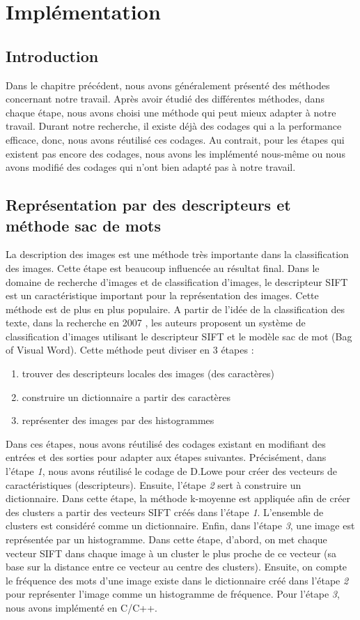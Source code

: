 \chapter{Implémentation}
\label{chap:impl}

\section{Introduction}
Dans le chapitre précédent, nous avons généralement présenté des méthodes concernant notre travail. Après avoir étudié des différentes méthodes, dans chaque étape, nous avons choisi une méthode qui peut mieux adapter à notre travail. Durant notre recherche, il existe déjà des codages qui a la performance efficace, donc, nous avons réutilisé ces codages. Au contrait, pour les étapes qui existent pas encore des codages, nous avons les implémenté nous-même ou nous avons modifié des codages qui n'ont bien adapté pas à notre travail.

\section{Représentation par des descripteurs et méthode sac de mots}
La description des images est une méthode très importante dans la classification des images. Cette étape est beaucoup influencée au résultat final. Dans le domaine de recherche d'images et de classification d'images, le descripteur SIFT \cite{low04} est un caractéristique important pour la représentation des images. Cette méthode est de plus en plus populaire. A partir de l'idée de la classification des texte, dans la recherche en 2007 \cite{bos07}, les auteurs proposent un système de classification d'images utilisant le descripteur SIFT et le modèle sac de mot (Bag of Visual Word). Cette méthode peut diviser en 3 étapes :
\begin{enumerate}
\item trouver des descripteurs locales des images (des caractères)
\item construire un dictionnaire a partir des caractères
\item représenter des images par des histogrammes
\end{enumerate}

Dans ces étapes, nous avons réutilisé des codages existant en modifiant des entrées et des sorties pour adapter aux étapes suivantes. Précisément, dans l'étape \textit{1}, nous avons réutilisé le codage de D.Lowe \cite{low99} pour créer des vecteurs de caractéristiques (descripteurs). Ensuite, l'étape \textit{2} sert à construire un dictionnaire. Dans cette étape, la méthode k-moyenne \cite{mq67} est appliquée afin de créer des clusters a partir des vecteurs SIFT créés dans l'étape \textit{1}. L'ensemble de clusters est considéré comme un dictionnaire. Enfin, dans l'étape \textit{3}, une image est représentée par un histogramme. Dans cette étape, d'abord, on met chaque vecteur SIFT dans chaque image à un cluster le plus proche de ce vecteur (sa base sur la distance entre ce vecteur au centre des clusters). Ensuite, on compte le fréquence des mots d'une image existe dans le dictionnaire créé dans l'étape \textit{2} pour représenter l'image comme un histogramme de fréquence. Pour l'étape \textit{3}, nous avons implémenté en C/C++.

